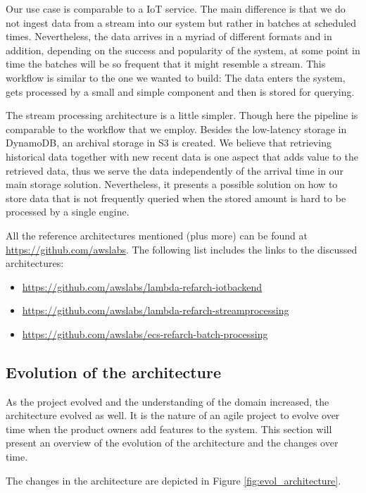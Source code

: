 Our use case is comparable to a IoT service. The main difference is that
we do not ingest data from a stream into our system but rather in batches
at scheduled times. Nevertheless, the data arrives in a myriad of different
formats and in addition, depending on the success and popularity of the system,
at some point in time the batches will be so frequent that it might resemble
a stream. This workflow is similar to the one we wanted to build: The data
enters the system, gets processed by a small and simple component and then is
stored for querying.

The stream processing architecture is a little simpler. Though here
the pipeline is comparable to the workflow that we employ. Besides
the low-latency storage in DynamoDB, an archival storage in S3 is created.
We believe that retrieving historical data together with new recent data
is one aspect that adds value to the retrieved data, thus we serve the data
independently of the arrival time in our main storage solution. Nevertheless,
it presents a possible solution on how to store data that is not frequently
queried when the stored amount is hard to be processed by a single engine.

All the reference architectures mentioned (plus more) can be found at
\url{https://github.com/awslabs}. The following list includes the links to
the discussed architectures:

\begin{itemize}
\tightlist
\item
  \url{https://github.com/awslabs/lambda-refarch-iotbackend}
\item
  \url{https://github.com/awslabs/lambda-refarch-streamprocessing}
\item
  \url{https://github.com/awslabs/ecs-refarch-batch-processing}
\end{itemize}

\subsection{Evolution of the architecture}\label{evolution-of-the-architecture}

As the project evolved and the understanding of the domain increased, the
architecture evolved as well. It is the nature of an agile project to
evolve over time when the product owners add features to the system.
This section will present an overview of the evolution of the
architecture and the changes over time.

The changes in the architecture are depicted in Figure \ref{fig:evol_architecture}.

